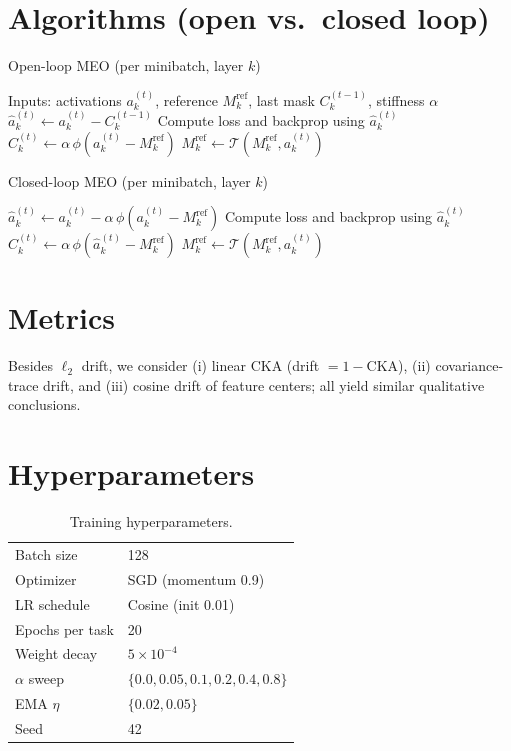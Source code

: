 \documentclass[11pt]{article}
\begin{document}
\appendix
\section{Algorithms (open vs.\ closed loop)}
\begin{algorithm}[h]
\caption{Open-loop MEO (per minibatch, layer $k$)}
\begin{algorithmic}[1]
\State Inputs: activations $a_k^{(t)}$, reference $M_k^{\text{ref}}$, last mask $C_k^{(t-1)}$, stiffness $\alpha$
\State $\hat a_k^{(t)} \gets a_k^{(t)} - C_k^{(t-1)}$
\State Compute loss and backprop using $\hat a_k^{(t)}$
\State $C_k^{(t)} \gets \alpha\,\phi\!\left(a_k^{(t)}-M_k^{\text{ref}}\right)$ 
\State $M_k^{\text{ref}} \gets \mathcal{T}(M_k^{\text{ref}}, a_k^{(t)})$ 
\end{algorithmic}
\end{algorithm}

\begin{algorithm}[h]
\caption{Closed-loop MEO (per minibatch, layer $k$)}
\begin{algorithmic}[1]
\State $\hat a_k^{(t)} \gets a_k^{(t)} - \alpha\,\phi\!\left(a_k^{(t)}-M_k^{\text{ref}}\right)$
\State Compute loss and backprop using $\hat a_k^{(t)}$
\State $C_k^{(t)} \gets \alpha\,\phi\!\left(\hat a_k^{(t)}-M_k^{\text{ref}}\right)$ 
\State $M_k^{\text{ref}} \gets \mathcal{T}(M_k^{\text{ref}}, a_k^{(t)})$
\end{algorithmic}
\end{algorithm}

\section{Metrics}
Besides $\ell_2$ drift, we consider (i) linear CKA (drift $=1-\mathrm{CKA}$), (ii) covariance-trace drift, and (iii) cosine drift of feature centers; all yield similar qualitative conclusions.

\section{Hyperparameters}
\begin{table}[h]\centering
\caption{Training hyperparameters.}
\begin{tabular}{ll}\toprule
Batch size & 128\\
Optimizer & SGD (momentum 0.9)\\
LR schedule & Cosine (init 0.01)\\
Epochs per task & 20\\
Weight decay & $5\times 10^{-4}$\\
$\alpha$ sweep & $\{0.0,0.05,0.1,0.2,0.4,0.8\}$\\
EMA $\eta$ & $\{0.02,0.05\}$\\
Seed & 42\\\bottomrule
\end{tabular}\end{table}
\end{document}
